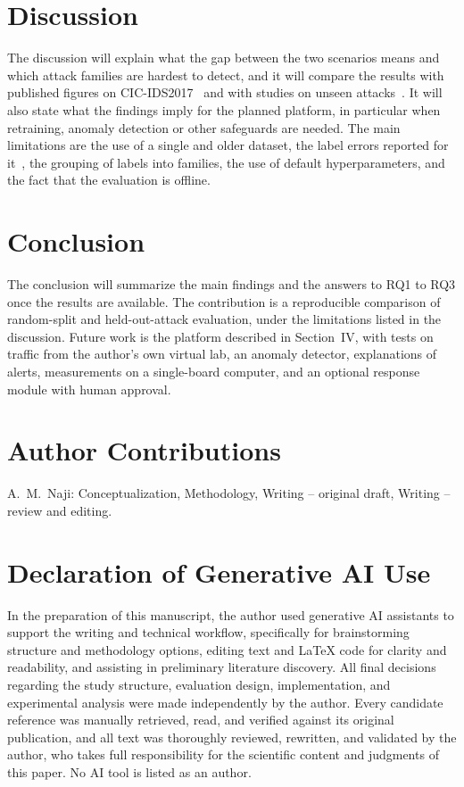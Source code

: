 \documentclass[conference]{IEEEtran}
\begin{document}
\section{Discussion}
The discussion will explain what the gap between the two scenarios means and which attack families are hardest to detect, and it will compare the results with published figures on CIC-IDS2017~\cite{maseer2021,rosay2022} and with studies on unseen attacks~\cite{verkerken2022,hindy2020}. It will also state what the findings imply for the planned platform, in particular when retraining, anomaly detection or other safeguards are needed. The main limitations are the use of a single and older dataset, the label errors reported for it~\cite{engelen2021,lanvin2023,liu2022}, the grouping of labels into families, the use of default hyperparameters, and the fact that the evaluation is offline.

\section{Conclusion}
The conclusion will summarize the main findings and the answers to RQ1 to RQ3 once the results are available. The contribution is a reproducible comparison of random-split and held-out-attack evaluation, under the limitations listed in the discussion. Future work is the platform described in Section~IV, with tests on traffic from the author's own virtual lab, an anomaly detector, explanations of alerts, measurements on a single-board computer, and an optional response module with human approval.

\section*{Author Contributions}
A.~M.~Naji: Conceptualization, Methodology, Writing -- original draft, Writing -- review and editing.

\section*{Declaration of Generative AI Use}
In the preparation of this manuscript, the author used generative AI assistants to support the writing and technical workflow, specifically for brainstorming structure and methodology options, editing text and LaTeX code for clarity and readability, and assisting in preliminary literature discovery. All final decisions regarding the study structure, evaluation design, implementation, and experimental analysis were made independently by the author. Every candidate reference was manually retrieved, read, and verified against its original publication, and all text was thoroughly reviewed, rewritten, and validated by the author, who takes full responsibility for the scientific content and judgments of this paper. No AI tool is listed as an author.



\end{document}
